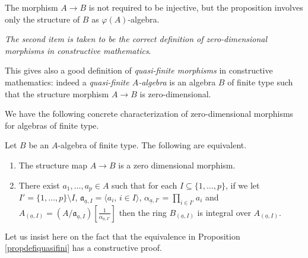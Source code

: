 \documentclass[11pt,a4paper,twoside]{article}
\newcommand \und[1]{\underline{#1}}
\newcommand{\gothic}{\mathfrak}
\newcommand{\fa}{{\gothic a}}
\newcommand\gen[1]{{\langle #1 \rangle}}
\newcommand{\cro}[1]{\left[#1\right]}
\newcommand{\crac}[2]{\cro{\frac{#1}{#2}}}
\begin{document}
The morphism $A\to B$ is  not required to be injective, but the proposition
involves only the
structure of $B$ as $\varphi(A)$-algebra.

\emph{The second item is taken to be the correct definition
of zero-dimensional morphisms in constructive mathematics}.

This gives also a good definition of \emph{quasi-finite morphisms} in constructive mathematics: indeed a \emph{quasi-finite $A$-algebra} is an algebra $B$ of finite type
such that the structure morphism $A\to B$ is zero-dimensional.

We have the following concrete characterization of zero-dimensional morphisms for algebras of finite type. 

\begin{proposition} \label{propdefiquasifini}
Let  $B$ be an $A$-algebra of finite type. The following are equivalent.
\begin{enumerate}
%
\item The structure map $A\to B$ is a zero dimensional morphism.  
%
\item There exist $a_1,\dots,a_p\in A$ such that for each $I\subseteq \{1,\dots,p\}$, if we let $I'=\{1,\dots,p\}\setminus I$, 
$\fa_{\und a,I}=\gen{a_i,\,i\in I} $, $\alpha_{\und a,I'}=
\prod_{i\in I'}a_i$ and 
$ 
A_{(\und a,I)}=\left(A/\fa_{\und a,I} \right) \crac 1 {\alpha_{\und a,I'}}   
 $
then the ring $B_{ (\und a,I) }$ is integral over $A_{ (\und a,I) }$. 

%
\end{enumerate}
\end{proposition}


Let us insist here on the fact that the equivalence in Proposition 
\ref{propdefiquasifini} has a constructive
proof.
\end{document}
